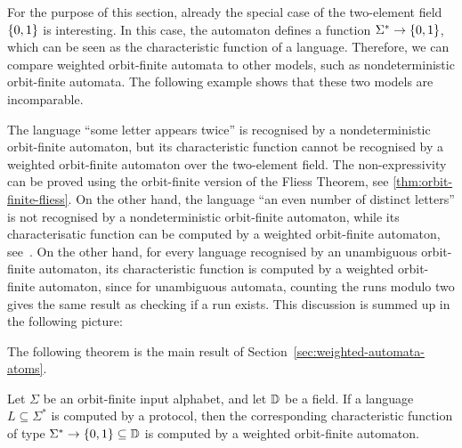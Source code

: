 For the purpose of this section, already the special case of the two-element field $\{0,1\}$ is interesting. In this case, the automaton defines a function $\Sigma^* \to \{0,1\}$, which can be seen as the characteristic function of a language. Therefore, we can compare weighted orbit-finite automata to other models, such as nondeterministic orbit-finite automata. The following example shows that these two  models are incomparable. 

\begin{myexample}
    The language ``some letter appears twice'' is recognised by a nondeterministic orbit-finite automaton, but its characteristic function cannot be  recognised by a weighted orbit-finite automaton over the two-element field. The non-expressivity can be proved using the orbit-finite version of the Fliess Theorem, see \cref{thm:orbit-finite-fliess}. On the other hand, the  language ``an even number of distinct letters'' is not recognised by a nondeterministic orbit-finite automaton, while its characterisatic function can  be computed by a weighted orbit-finite automaton, see~\cite[Example 3.2]{orbitFiniteVectorTheoretics}. On the other hand, for every language recognised by an unambiguous orbit-finite automaton, its characteristic function is computed by a weighted orbit-finite automaton, since for unambiguous automata, counting the runs modulo two gives the same result as checking if a run exists. This discussion is summed up in the following picture:
\end{myexample}

The following theorem is the main result of Section~\ref{sec:weighted-automata-atoms}.
\begin{theorem}\label{thm:orbit-finite-protocol-to-weighted}
    Let $\Sigma$ be an orbit-finite input alphabet, and let $\mathbb D$ be a field.
    If a language $L \subseteq \Sigma^*$ is computed by a protocol, then the corresponding characteristic function of type $\Sigma^* \to \{0,1\} \subseteq \mathbb D$  is computed by a weighted orbit-finite automaton.
\end{theorem}


